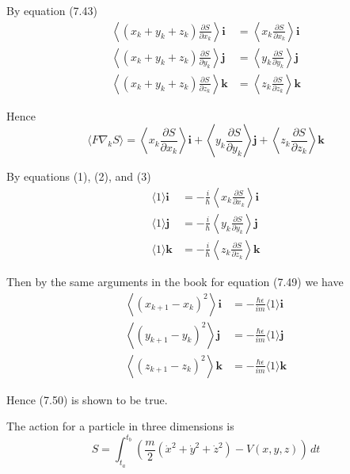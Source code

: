 By equation (7.43)
\begin{align*}
\left\langle(x_k+y_k+z_k)\frac{\partial S}{\partial x_k}\right\rangle\mathbf i
&=\left\langle x_k\frac{\partial S}{\partial x_k}\right\rangle\mathbf i
\\
\left\langle(x_k+y_k+z_k)\frac{\partial S}{\partial y_k}\right\rangle\mathbf j
&=\left\langle y_k\frac{\partial S}{\partial y_k}\right\rangle\mathbf j
\\
\left\langle(x_k+y_k+z_k)\frac{\partial S}{\partial z_k}\right\rangle\mathbf k
&=\left\langle z_k\frac{\partial S}{\partial z_k}\right\rangle\mathbf k
\end{align*}

Hence
\begin{equation*}
\langle F\nabla_kS\rangle
=\left\langle x_k\frac{\partial S}{\partial x_k}\right\rangle\mathbf i
+\left\langle y_k\frac{\partial S}{\partial y_k}\right\rangle\mathbf j
+\left\langle z_k\frac{\partial S}{\partial z_k}\right\rangle\mathbf k
\tag{3}
\end{equation*}

By equations (1), (2), and (3)
\begin{align*}
\langle1\rangle\mathbf i
&=-\frac{i}{\hbar}\left\langle x_k\frac{\partial S}{\partial x_k}\right\rangle\mathbf i
\\
\langle1\rangle\mathbf j
&=-\frac{i}{\hbar}\left\langle y_k\frac{\partial S}{\partial y_k}\right\rangle\mathbf j
\\
\langle1\rangle\mathbf k
&=-\frac{i}{\hbar}\left\langle z_k\frac{\partial S}{\partial z_k}\right\rangle\mathbf k
\end{align*}

Then by the same arguments in the book for equation (7.49) we have
\begin{align*}
\left\langle(x_{k+1}-x_k)^2\right\rangle\mathbf i&=-\frac{\hbar\epsilon}{im}\langle1\rangle\mathbf i
\\
\left\langle(y_{k+1}-y_k)^2\right\rangle\mathbf j&=-\frac{\hbar\epsilon}{im}\langle1\rangle\mathbf j
\\
\left\langle(z_{k+1}-z_k)^2\right\rangle\mathbf k&=-\frac{\hbar\epsilon}{im}\langle1\rangle\mathbf k
\end{align*}

Hence (7.50) is shown to be true.

\bigskip
The action for a particle in three dimensions is
\begin{equation*}
S=\int_{t_a}^{t_b}\left(\frac{m}{2}\left(\dot x^2+\dot y^2+\dot z^2\right)-V(x,y,z)\right)\,dt
\end{equation*}

